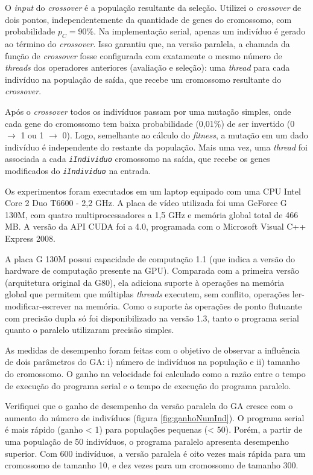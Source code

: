 O \emph{input} do \emph{crossover} é a população resultante da seleção. Utilizei o \emph{crossover} de dois pontos, independentemente da quantidade de genes do cromossomo, com probabilidade $p_C = 90\%$. Na implementação serial, apenas um indivíduo é gerado ao término do \emph{crossover}. Isso garantiu que, na versão paralela, a chamada da função de \emph{crossover} fosse configurada com exatamente o mesmo número de \emph{threads} dos operadores anteriores (avaliação e seleção): uma \emph{thread} para cada indivíduo na população de saída, que recebe um cromossomo resultante do \emph{crossover}.

Após o \emph{crossover} todos os indivíduos passam por uma mutação simples, onde cada gene do cromossomo tem baixa probabilidade (0,01\%) de ser invertido (0 $\rightarrow$ 1 ou 1 $\rightarrow$ 0). Logo, semelhante ao cálculo do \emph{fitness}, a mutação em um dado indivíduo é independente do restante da população. Mais uma vez, uma \emph{thread} foi associada a cada \textit{\texttt{iIndividuo}} cromossomo na saída, que recebe os genes modificados do \textit{\texttt{iIndividuo}} na entrada. 

	Os experimentos foram executados em um laptop equipado com uma CPU Intel Core 2 Duo T6600 - 2,2 GHz. A placa de vídeo utilizada foi uma GeForce G 130M, com quatro multiprocessadores a 1,5 GHz e memória global total de 466 MB. A versão da API CUDA foi a 4.0, programada com o Microsoft Visual C++ Express 2008.
	
	A placa G 130M possui capacidade de computação 1.1 (que indica a versão do hardware de computação presente na GPU). Comparada com a primeira versão (arquitetura original da G80), ela adiciona suporte à operações na memória global que permitem que múltiplas \emph{threads} executem, sem conflito, operações ler-modificar-escrever na memória. Como o suporte às operações de ponto flutuante com precisão dupla só foi disponibilizado na versão 1.3, tanto o programa serial quanto o paralelo utilizaram precisão simples.
	
	As medidas de desempenho foram feitas com o objetivo de observar a influência de dois parâmetros do GA: i) número de indivíduos na população e ii) tamanho do cromossomo. O ganho na velocidade foi calculado como a razão entre o tempo de execução do programa serial e o tempo de execução do programa paralelo.

Verifiquei que o ganho de desempenho da versão paralela do GA cresce com o aumento do número de indivíduos (figura \ref{fig:ganhoNumInd}). O programa serial é mais rápido (ganho < 1) para populações pequenas (< 50). Porém, a partir de uma população de 50 indivíduos, o programa paralelo apresenta desempenho superior. Com 600 indivíduos, a versão paralela é oito vezes mais rápida para um cromossomo de tamanho 10, e dez vezes para um cromossomo de tamanho 300. 

